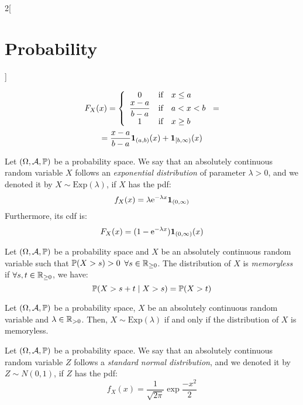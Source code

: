 \documentclass[../../../main.tex]{subfiles}
\begin{document}
\begin{multicols}{2}[\section{Probability}]
\begin{definition}
    \begin{multline*}
      F_X(x)=\left\{
      \begin{array}{ccl}
        0                            & \text{if} & x\leq a \\
        \displaystyle\frac{x-a}{b-a} & \text{if} & a<x<b   \\
        1                            & \text{if} & x\geq b \\
      \end{array}
      \right.=\\=\frac{x-a}{b-a}\boldsymbol{\mathrm{1}}_{(a,b)}(x)+\boldsymbol{\mathrm{1}}_{[b,\infty)}(x)
    \end{multline*}
  \end{definition}
  \begin{definition}
    Let $(\Omega,\mathcal{A},\mathbb{P})$ be a probability space. We say that an absolutely continuous random variable $X$ follows an \textit{exponential distribution} of parameter $\lambda>0$, and we denoted it by $X\sim \text{Exp}(\lambda)$, if $X$ has the pdf: $$f_X(x)=\lambda\mathrm{e}^{-\lambda x}\boldsymbol{\mathrm{1}}_{(0,\infty)}$$ Furthermore, its cdf is:
    $$F_X(x)=(1-\mathrm{e}^{-\lambda x})\boldsymbol{\mathrm{1}}_{(0,\infty)}(x)$$
  \end{definition}
  \begin{definition}
    Let $(\Omega,\mathcal{A},\mathbb{P})$ be a probability space and $X$ be an absolutely continuous random variable such that $\mathbb{P}(X >s)>0$ $\forall s\in\mathbb{R}_{\geq 0}$. The distribution of $X$ is \textit{memoryless} if $\forall s,t\in\mathbb{R}_{\geq 0}$, we have: $$\mathbb{P}(X>s+t\mid X >s)=\mathbb{P}(X>t)$$
  \end{definition}
  \begin{prop}
    Let $(\Omega,\mathcal{A},\mathbb{P})$ be a probability space, $X$ be an absolutely continuous random variable and $\lambda\in\mathbb{R}_{>0}$. Then, $X\sim\text{Exp}(\lambda)$ if and only if the distribution of $X$ is memoryless.
  \end{prop}
  \begin{definition}
    Let $(\Omega,\mathcal{A},\mathbb{P})$ be a probability space. We say that an absolutely continuous random variable $Z$ follows a \textit{standard normal distribution}, and we denoted it by $Z\sim N(0,1)$, if $Z$ has the pdf: $$f_X(x)=\frac{1}{\sqrt{2\pi}}\exp{\frac{-x^2}{2}}$$
  \end{definition}
  \begin{definition}

\end{definition}
\end{multicols}
\end{document}
